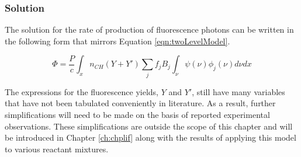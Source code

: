 \subsubsection{Solution}
\label{subsubsec:improved-model-solution}

The solution for the rate of production of fluorescence photons can be written in the following form that mirrors Equation \ref{eqn:twoLevelModel}.

\begin{equation}
  \Phi = \frac{P}{c} \int_x n_{CH} (Y + Y') \sum_j f_j B_j \int_\nu \psi(\nu) \phi_j(\nu) d\nu dx
  \label{eqn:improvedModel}
\end{equation}

The expressions for the fluorescence yields, \(Y\) and \(Y'\), still have many variables that have not been tabulated conveniently in literature.
As a result, further simplifications will need to be made on the basis of reported experimental observations.
These simplifications are outside the scope of this chapter and will be introduced in Chapter \ref{ch:chplif} along with the results of applying this model to various reactant mixtures.

